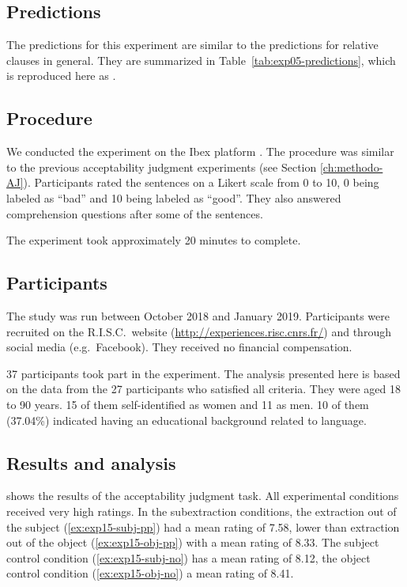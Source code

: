 \subsection{Predictions}

The predictions for this experiment are similar to the predictions for relative clauses in general. They are summarized in Table~\ref{tab:exp05-predictions}, which is reproduced here as .



\subsection{Procedure} 

We conducted the experiment on the Ibex platform \citep{Ibex}. The procedure was similar to the previous acceptability judgment experiments (see Section \ref{ch:methodo-AJ}). Participants rated the sentences on a Likert scale from 0 to 10, 0 being labeled as ``bad'' and 10 being labeled as ``good''. They also answered comprehension questions after some of the sentences.

The experiment took approximately 20 minutes to complete. 

\subsection{Participants}

The study was run between October 2018 and January 2019. 
Participants were recruited on the R.I.S.C.\ website (\url{http://experiences.risc.cnrs.fr/}) and through social media (e.g.\ Facebook).
They received no financial compensation. 
 
37 participants took part in the experiment. 
The analysis presented here is based on the data from the 27 participants who satisfied all criteria.
They were aged 18 to 90 years. 15 of them self-identified as women and 11 as men. 10 of them (37.04\%) indicated having an educational background related to language.

\subsection{Results and analysis}

 shows the results of the acceptability judgment task.
All experimental conditions received very high ratings. In the subextraction conditions, the extraction out of the subject (\ref{ex:exp15-subj-pp}) had a mean rating of 7.58, lower than extraction out of the object (\ref{ex:exp15-obj-pp}) with a mean rating of 8.33. The subject control condition (\ref{ex:exp15-subj-no}) has a mean  rating of 8.12, the object control condition (\ref{ex:exp15-obj-no}) a mean  rating of 8.41.

